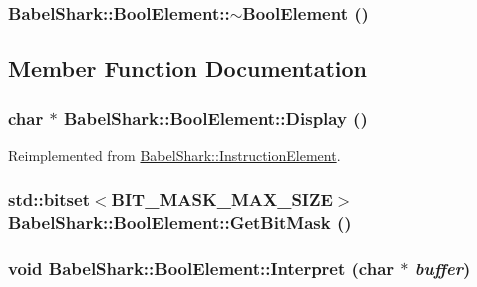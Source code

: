 \hypertarget{class_babel_shark_1_1_bool_element_71cee8143fa6926975a4ff619d578de9}{
\subsubsection[{$\sim$BoolElement}]{\setlength{\rightskip}{0pt plus 5cm}BabelShark::BoolElement::$\sim$BoolElement ()}}
\label{class_babel_shark_1_1_bool_element_71cee8143fa6926975a4ff619d578de9}




\subsection{Member Function Documentation}
\hypertarget{class_babel_shark_1_1_bool_element_7908eb1bccd3d590bfa3da4735bcec76}{
\subsubsection[{Display}]{\setlength{\rightskip}{0pt plus 5cm}char $\ast$ BabelShark::BoolElement::Display ()}}
\label{class_babel_shark_1_1_bool_element_7908eb1bccd3d590bfa3da4735bcec76}




Reimplemented from \hyperlink{class_babel_shark_1_1_instruction_element_6c98ad187a2a12399eb90a8cf9e2aec0}{BabelShark::InstructionElement}.\hypertarget{class_babel_shark_1_1_bool_element_0a35c7443eb629eb360b68909a827cd7}{
\subsubsection[{GetBitMask}]{\setlength{\rightskip}{0pt plus 5cm}std::bitset$<$BIT\_\-MASK\_\-MAX\_\-SIZE$>$ BabelShark::BoolElement::GetBitMask ()}}
\label{class_babel_shark_1_1_bool_element_0a35c7443eb629eb360b68909a827cd7}


\hypertarget{class_babel_shark_1_1_bool_element_5eac4fa70d0dcf64414000285324d476}{
\subsubsection[{Interpret}]{\setlength{\rightskip}{0pt plus 5cm}void BabelShark::BoolElement::Interpret (char $\ast$ {\em buffer})}}
\label{class_babel_shark_1_1_bool_element_5eac4fa70d0dcf64414000285324d476}




